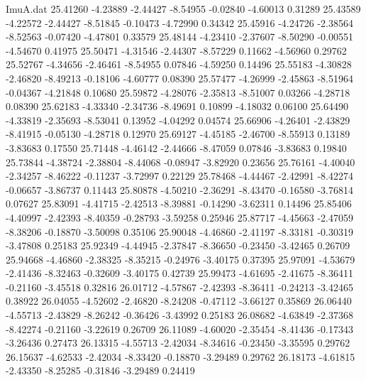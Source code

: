 \begin{filecontents}{ImuA.dat}
  25.41260   -4.23889   -2.44427   -8.54955   -0.02840   -4.60013    0.31289
  25.43589   -4.22572   -2.44427   -8.51845   -0.10473   -4.72990    0.34342
  25.45916   -4.24726   -2.38564   -8.52563   -0.07420   -4.47801    0.33579
  25.48144   -4.23410   -2.37607   -8.50290   -0.00551   -4.54670    0.41975
  25.50471   -4.31546   -2.44307   -8.57229    0.11662   -4.56960    0.29762
  25.52767   -4.34656   -2.46461   -8.54955    0.07846   -4.59250    0.14496
  25.55183   -4.30828   -2.46820   -8.49213   -0.18106   -4.60777    0.08390
  25.57477   -4.26999   -2.45863   -8.51964   -0.04367   -4.21848    0.10680
  25.59872   -4.28076   -2.35813   -8.51007    0.03266   -4.28718    0.08390
  25.62183   -4.33340   -2.34736   -8.49691    0.10899   -4.18032    0.06100
  25.64490   -4.33819   -2.35693   -8.53041    0.13952   -4.04292    0.04574
  25.66906   -4.26401   -2.43829   -8.41915   -0.05130   -4.28718    0.12970
  25.69127   -4.45185   -2.46700   -8.55913    0.13189   -3.83683    0.17550
  25.71448   -4.46142   -2.44666   -8.47059    0.07846   -3.83683    0.19840
  25.73844   -4.38724   -2.38804   -8.44068   -0.08947   -3.82920    0.23656
  25.76161   -4.40040   -2.34257   -8.46222   -0.11237   -3.72997    0.22129
  25.78468   -4.44467   -2.42991   -8.42274   -0.06657   -3.86737    0.11443
  25.80878   -4.50210   -2.36291   -8.43470   -0.16580   -3.76814    0.07627
  25.83091   -4.41715   -2.42513   -8.39881   -0.14290   -3.62311    0.14496
  25.85406   -4.40997   -2.42393   -8.40359   -0.28793   -3.59258    0.25946
  25.87717   -4.45663   -2.47059   -8.38206   -0.18870   -3.50098    0.35106
  25.90048   -4.46860   -2.41197   -8.33181   -0.30319   -3.47808    0.25183
  25.92349   -4.44945   -2.37847   -8.36650   -0.23450   -3.42465    0.26709
  25.94668   -4.46860   -2.38325   -8.35215   -0.24976   -3.40175    0.37395
  25.97091   -4.53679   -2.41436   -8.32463   -0.32609   -3.40175    0.42739
  25.99473   -4.61695   -2.41675   -8.36411   -0.21160   -3.45518    0.32816
  26.01712   -4.57867   -2.42393   -8.36411   -0.24213   -3.42465    0.38922
  26.04055   -4.52602   -2.46820   -8.24208   -0.47112   -3.66127    0.35869
  26.06440   -4.55713   -2.43829   -8.26242   -0.36426   -3.43992    0.25183
  26.08682   -4.63849   -2.37368   -8.42274   -0.21160   -3.22619    0.26709
  26.11089   -4.60020   -2.35454   -8.41436   -0.17343   -3.26436    0.27473
  26.13315   -4.55713   -2.42034   -8.34616   -0.23450   -3.35595    0.29762
  26.15637   -4.62533   -2.42034   -8.33420   -0.18870   -3.29489    0.29762
  26.18173   -4.61815   -2.43350   -8.25285   -0.31846   -3.29489    0.24419

\end{filecontents}
